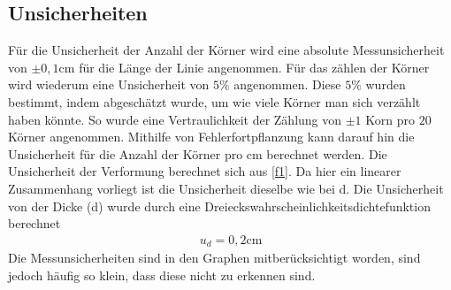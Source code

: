 \documentclass[
	a4paper,
	12pt,
	pagesize,
	ngerman
]{scrartcl}
\begin{document}
\subsection{Unsicherheiten}
Für die Unsicherheit der Anzahl der Körner wird eine absolute Messunsicherheit von $\pm 0,1$cm für die Länge der Linie angenommen. Für das zählen der Körner  wird wiederum eine Unsicherheit von $5\%$ angenommen. Diese $5\%$ wurden bestimmt, indem abgeschätzt wurde, um wie viele Körner man sich verzählt haben könnte. So wurde eine Vertraulichkeit der Zählung von $\pm 1$ Korn pro $20$ Körner angenommen. Mithilfe von Fehlerfortpflanzung kann darauf hin die Unsicherheit für die Anzahl der Körner pro cm berechnet werden. 
Die Unsicherheit der Verformung berechnet sich aus \cref{f1}.
Da hier ein linearer Zusammenhang vorliegt ist die Unsicherheit dieselbe wie bei d. Die Unsicherheit von der Dicke (d) wurde durch eine Dreieckswahrscheinlichkeitsdichtefunktion berechnet 
\begin{align*}
    u_d = 0,2\text{cm}
\end{align*}
Die Messunsicherheiten sind in den Graphen mitberücksichtigt worden, sind jedoch häufig so klein, dass diese nicht zu erkennen sind.
\end{document}

